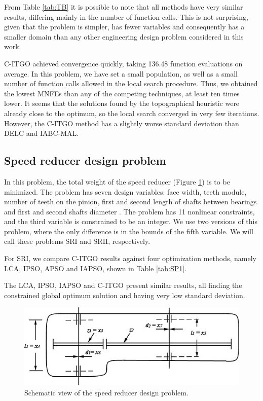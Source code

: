 

From Table \ref{tab:TB} it is possible to note that all methods have very similar results, differing mainly in the number of function calls. This is not surprising, given that the problem is simpler, has fewer variables and consequently has a smaller domain than any other engineering design problem considered in this work.

C-ITGO achieved convergence quickly, taking 136.48 function evaluations on average. In this problem, we have set a small population, as well as a small number of function calls allowed in the local search procedure. Thus, we obtained the lowest MNFEs than any of the competing techniques, at least ten times lower. It seems that the solutions found by the topographical heuristic were already close to the optimum, so the local search converged in very few iterations. However, the C-ITGO method has a slightly worse standard deviation than DELC and IABC-MAL.



\subsection{Speed reducer design problem}

In this problem, the total weight of the speed reducer (Figure \ref{fig:SR}) is to be minimized. The problem has seven design variables: face width, teeth module, number of teeth on the pinion, first and second length of shafts between bearings and first and second shafts diameter \citep{SR}. The problem has 11 nonlinear constraints, and the third variable is constrained to be an integer. We use two versions of this problem, where the only difference is in the bounds of the fifth variable. We will call these problems SRI and SRII, respectively.


For SRI, we compare C-ITGO results against four optimization methods, namely LCA, IPSO, APSO and IAPSO, shown in Table \ref{tab:SP1}.

The LCA, IPSO, IAPSO and C-ITGO present similar results, all finding the constrained global optimum solution and having very low standard deviation.

\begin{figure}[h]
    \begin{center}
    \includegraphics[scale=0.6]{Imgs/SR.jpg}
    \end{center}
    \captionsetup{justification=centering}
    \caption{Schematic view of the speed reducer design problem.}\label{fig:SR}
\end{figure}


